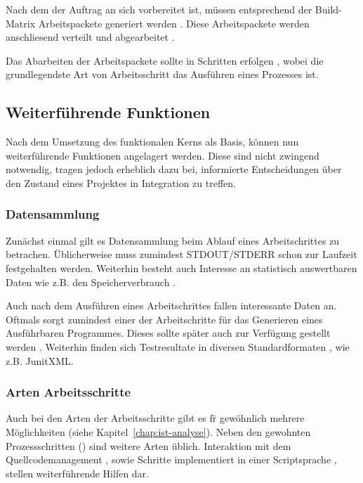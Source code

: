 Nach dem der Auftrag an sich vorbereitet ist, m\"ussen entsprechend der Build-Matrix 
Arbeitspackete generiert werden .
Diese Arbeitspackete werden anschliesend verteilt  und abgearbeitet .

Das Abarbeiten der Arbeitspackete sollte in Schritten erfolgen ,
wobei die grundlegendste Art von Arbeitsschritt das Ausf\"uhren eines Prozesses  ist.


\subsection{Weiterf\"uhrende Funktionen}

Nach dem Umsetzung des funktionalen Kerns als Basis,
k\"onnen nun weiterf\"uhrende Funktionen angelagert werden.
Diese sind nicht zwingend notwendig, tragen jedoch erheblich dazu bei,
informierte Entscheidungen \"uber den Zustand eines Projektes in Integration zu treffen.

\subsubsection{Datensammlung}

Zun\"achst einmal gilt es Datensammlung beim Ablauf eines Arbeitschrittes zu betrachen.
\"Ublicherweise muss zumindest STDOUT/STDERR schon zur Laufzeit festgehalten  werden.
Weiterhin besteht auch Interesse an statistisch auswertbaren Daten
wie z.B. den Speicherverbrauch .

Auch nach dem Ausf\"uhren eines Arbeitschrittes fallen interessante Daten an.
Oftmals sorgt zumindest einer der Arbeitschritte f\"ur das Generieren eines Ausf\"uhrbaren Programmes.
Dieses sollte sp\"ater auch zur Verf\"ugung gestellt werden .
Weiterhin finden sich Testresultate in diversen Standardformaten ,
wie z.B. JunitXML.

\subsubsection{Arten Arbeitsschritte}

Auch bei den Arten der Arbeitsschritte gibt es f\"r gew\"ohnlich mehrere M\"oglichkeiten (siehe Kapitel~\ref{chap:ist-analyse}).
Neben den gewohnten Prozessschritten () sind weitere Arten \"ublich.
Interaktion mit dem Quellcodemanagement , sowie
Schritte implementiert in einer Scriptsprache ,
stellen weiterf\"uhrende Hilfen dar.

